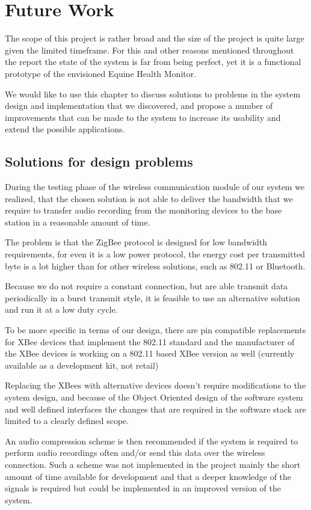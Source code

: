 \chapter{Future Work}
The scope of this project is rather broad and the size of the project is quite large given the limited timeframe. For this and other reasons mentioned throughout the report the state of the system is far from being perfect, yet it is a functional prototype of the envisioned Equine Health Monitor. 

We would like to use this chapter to discuss solutions to problems in the system design and implementation that we discovered, and propose a number of improvements that can be made to the system to increase its usability and extend the possible applications.


\section{Solutions for design problems}
During the testing phase of the wireless communication module of our system we realized, that the chosen solution is not able to deliver the bandwidth that we require to transfer audio recording from the monitoring devices to the base station in a reasonable amount of time. 

The problem is that the ZigBee protocol is designed for low bandwidth requirements, for even it is a low power protocol, the energy cost per transmitted byte is a lot higher than for other wireless solutions, such as 802.11 or Bluetooth.

Because we do not require a constant connection, but are able transmit data periodically in a burst transmit style, it is feasible to use an alternative solution and run it at a low duty cycle. 

To be more specific in terms of our design, there are pin compatible replacements for XBee devices that implement the 802.11 standard and the manufacturer of the XBee devices is working on a 802.11 based XBee version as well (currently available as a development kit, not retail)

Replacing the XBees with alternative devices doesn’t require modifications to the system design, and because of the Object Oriented design of the software system and well defined interfaces the changes that are required in the software stack are limited to a clearly defined scope.

An audio compression scheme is then recommended if the system is required to perform audio recordings often and/or send this data over the wireless connection. Such a scheme was not implemented in the project mainly the short amount of time available for development and that a deeper knowledge of the signals is required but could be implemented in an improved version of the system.

